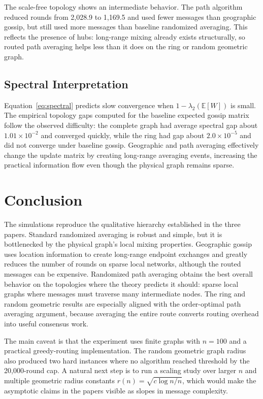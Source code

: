 \documentclass[conference]{IEEEtran}
\begin{document}
The scale-free topology shows an intermediate behavior. The path algorithm reduced rounds from 2,028.9 to 1,169.5 and used fewer messages than geographic gossip, but still used more messages than baseline randomized averaging. This reflects the presence of hubs: long-range mixing already exists structurally, so routed path averaging helps less than it does on the ring or random geometric graph.

\subsection{Spectral Interpretation}
Equation~\eqref{eq:spectral} predicts slow convergence when $1-\lambda_2(\mathbb{E}[W])$ is small. The empirical topology gaps computed for the baseline expected gossip matrix follow the observed difficulty: the complete graph had average spectral gap about $1.01\times 10^{-2}$ and converged quickly, while the ring had gap about $2.0\times 10^{-5}$ and did not converge under baseline gossip. Geographic and path averaging effectively change the update matrix by creating long-range averaging events, increasing the practical information flow even though the physical graph remains sparse.

\section{Conclusion}
The simulations reproduce the qualitative hierarchy established in the three papers. Standard randomized averaging is robust and simple, but it is bottlenecked by the physical graph's local mixing properties. Geographic gossip uses location information to create long-range endpoint exchanges and greatly reduces the number of rounds on sparse local networks, although the routed messages can be expensive. Randomized path averaging obtains the best overall behavior on the topologies where the theory predicts it should: sparse local graphs where messages must traverse many intermediate nodes. The ring and random geometric results are especially aligned with the order-optimal path averaging argument, because averaging the entire route converts routing overhead into useful consensus work.

The main caveat is that the experiment uses finite graphs with $n=100$ and a practical greedy-routing implementation. The random geometric graph radius also produced two hard instances where no algorithm reached threshold by the 20,000-round cap. A natural next step is to run a scaling study over larger $n$ and multiple geometric radius constants $r(n)=\sqrt{c\log n/n}$, which would make the asymptotic claims in the papers visible as slopes in message complexity.
\end{document}
